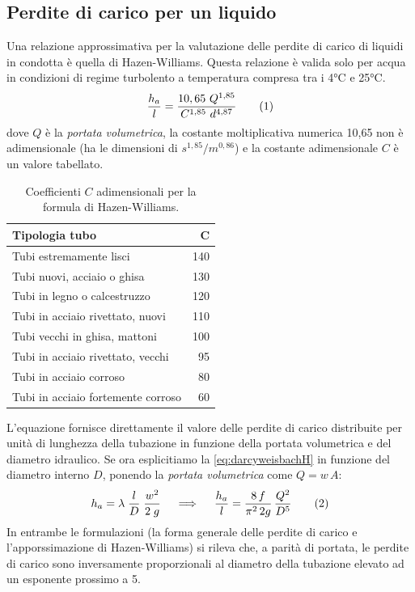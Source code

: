 \subsection{Perdite di carico per un liquido}
Una relazione approssimativa per la valutazione delle perdite di carico di liquidi in condotta è quella di Hazen-Williams.  Questa relazione è valida solo per acqua in condizioni di regime turbolento a temperatura compresa tra i 4°C e 25°C.
\[\frac{h_a}{l} = \frac{10,65\ Q^{1,85}}{C^{1,85}\ d^{4,87}} \addtag \label{eq:HW}\]
dove \(Q\) è la \textit{portata volumetrica}, la costante moltiplicativa numerica 10,65 non è adimensionale (ha le dimensioni di \(s^{1,85}/m^{0,86}\)) e la costante adimensionale \(C\) è un valore tabellato.
\begin{table}[htbp]
    \small
    \centering
    \begin{tabular}{|l|r|}
        \hline
        \textbf{Tipologia tubo} & \(\mathbf{C}\)\\
        \hline
             Tubi estremamente lisci & 140\\
        Tubi nuovi, acciaio o ghisa & 130\\
        Tubi in legno o calcestruzzo & 120\\
        Tubi in acciaio rivettato, nuovi & 110\\
        Tubi vecchi in ghisa, mattoni & 100\\
        Tubi in acciaio rivettato, vecchi & 95\\
        Tubi in acciaio corroso & 80\\
        Tubi in acciaio fortemente corroso & 60\\
        \hline
    \end{tabular}
    \label{tab:coefficientiHZ}
    \caption{Coefficienti $C$ adimensionali per la formula di Hazen-Williams.}
\end{table}
L'equazione fornisce direttamente il valore delle perdite di carico distribuite per unità di lunghezza della tubazione in funzione della portata volumetrica e del diametro idraulico. Se ora esplicitiamo la \eqref{eq:darcyweisbachH} in funzione del diametro interno \(D\), ponendo la \textit{portata volumetrica} come \(Q=w \, A\):
\[h_a = \lambda \; \frac{l}{D} \; \frac{w^2}{2 \; g} \quad \implies \quad \frac{h_a}{l}=\frac{8 \, f}{\pi^2 \, 2g} \, \frac{Q^2}{D^5} \addtag \label{eq:darcyweisbachespl} \]
In entrambe le formulazioni (la forma generale delle perdite di carico e l'apporssimazione di Hazen-Williams) si rileva che, a parità di portata, le perdite di carico sono inversamente proporzionali al diametro della tubazione elevato ad un esponente prossimo a 5.

